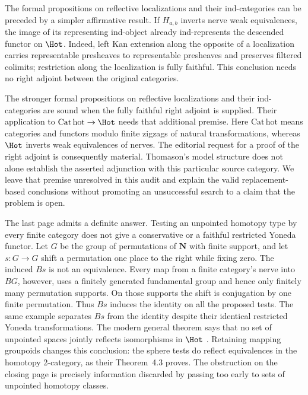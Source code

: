 The formal propositions on reflective localizations and their ind-categories
can be preceded by a simpler affirmative result. If $H_{a,b}$ inverts nerve
weak equivalences, the image of its representing ind-object already
ind-represents the descended functor on $\Hot$. Indeed, left Kan extension
along the opposite of a localization carries representable presheaves to
representable presheaves and preserves filtered colimits; restriction along
the localization is fully faithful. This conclusion needs no right adjoint
between the original categories.

The stronger formal propositions on reflective localizations and their ind-categories
are sound when the fully faithful right adjoint is supplied. Their application
to $\mathrm{Cat\,hot}\to\Hot$ needs that additional premise. Here
$\mathrm{Cat\,hot}$ means categories and functors modulo finite zigzags of
natural transformations, whereas $\Hot$ inverts weak equivalences of nerves.
The editorial request for a proof of the right adjoint is consequently
material. Thomason's model structure does not alone establish the asserted
adjunction with this particular source category. We leave that premise
unresolved in this audit and explain the valid replacement-based conclusions
without promoting an unsuccessful search to a claim that the problem is open.

The last page admits a definite answer. Testing an unpointed homotopy type
by every finite category does not give a conservative or a faithful restricted
Yoneda functor. Let $G$ be the group of permutations of $\mathbf N$ with finite
support, and let $s:G\to G$ shift a permutation one place to the right while
fixing zero. The induced $Bs$ is not an equivalence. Every map from a finite
category's nerve into $BG$, however, uses a finitely generated fundamental
group and hence only finitely many permutation supports. On those supports
the shift is conjugation by one finite permutation. Thus $Bs$ induces the
identity on all the proposed tests. The same example separates $Bs$ from
the identity despite their identical restricted Yoneda transformations.
The modern general theorem says that no set of unpointed spaces jointly
reflects isomorphisms in $\Hot$ \citep[Theorem~2.1 and Remark~2.3]{ArlinChristensen2023}.
Retaining mapping groupoids changes this conclusion: the sphere tests do
reflect equivalences in the homotopy 2-category, as their Theorem~4.3 proves.
The obstruction on the closing page is precisely information discarded by
passing too early to sets of unpointed homotopy classes.
